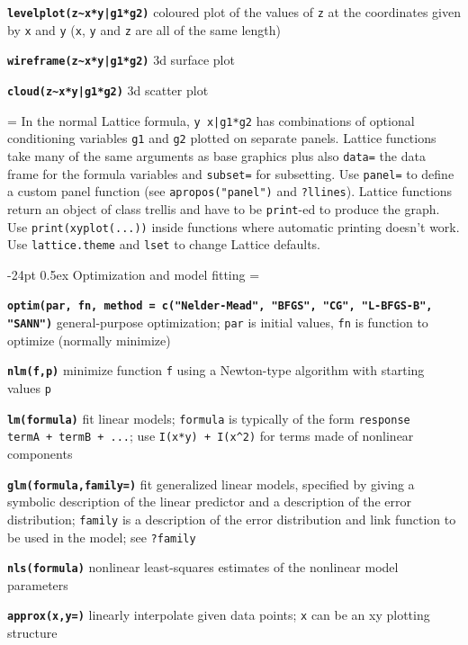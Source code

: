 \documentclass[10pt,landscape]{article}
\makeatletter
\renewcommand\section{\@startsection{section}{1}{0mm}%
                                     {-24pt}%
                                     {0.5ex}%
                                {\color{blue}\normalfont\large\bfseries}}
\newcommand{\code}{\texttt}
\newcommand{\bcode}[1]{\texttt{\textbf{#1}}}
\makeatother
\begin{document}
\begin{multicols*}{3}
\bcode{levelplot(z\~{}x*y|g1*g2)}  coloured plot of the values of \code{z} at the coordinates given by \code{x} and \code{y} (\code{x}, \code{y} and \code{z} are all of the same length)

\bcode{wireframe(z\~{}x*y|g1*g2)}  3d surface plot

\bcode{cloud(z\~{}x*y|g1*g2)}  3d scatter plot

\everypar={\hangindent=0mm}
In the normal Lattice formula, \code{y~x|g1*g2} has
combinations of optional conditioning variables \code{g1}
and \code{g2} plotted on separate panels. Lattice functions 
take many of the same arguments as base
graphics plus also \code{data=} the data frame for the formula
variables and \code{subset=} for subsetting. Use \code{panel=} to
define a custom panel function (see \code{apropos("panel")}
and \code{?llines}). Lattice functions return an object of class
trellis and have to be \code{print}-ed to produce the graph. Use
\code{print(xyplot(...))} inside functions where automatic
printing doesn't work. Use \code{lattice.theme} and \code{lset} to
change Lattice defaults.



\section{Optimization and model fitting}
\everypar={\hangindent=9mm}

\bcode{optim(par, fn, method = c("Nelder-Mead", "BFGS", "CG",
  "L-BFGS-B", "SANN")} general-purpose optimization; \code{par} is
  initial values, \code{fn} is function to optimize (normally minimize)

\bcode{nlm(f,p)} minimize function \code{f} using a Newton-type
algorithm with starting values \code{p}

\bcode{lm(formula)} fit linear models; \code{formula} is typically of
     the form \code{response ~ termA + termB + ...}; use \code{I(x*y)
     + I(x\^{}2)} for terms made of nonlinear components

\bcode{glm(formula,family=)} fit generalized linear models, specified by
     giving a symbolic description of the linear predictor and a
     description of the error distribution; \code{family} is a
     description of the error distribution and link function to
          be used in the model; see \code{?family}

\bcode{nls(formula)} nonlinear least-squares estimates of the nonlinear
     model parameters

\bcode{approx(x,y=)} linearly interpolate given data points; \code{x} can be an
xy plotting structure


\end{multicols*}
\end{document}
